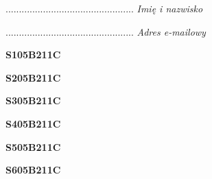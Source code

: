 \begin{turn}{90}\begin{minipage}{\linewidth} \vspace{20mm} ................................................  \textit{Imię i nazwisko}\end{minipage}\end{turn}

\begin{turn}{90}\begin{minipage}{\linewidth} \vspace{20mm} ................................................  \textit{Adres e-mailowy}\end{minipage}\end{turn}

\begin{turn}{90}\huge \begin{minipage}{\linewidth} \vspace{10mm}\textbf{S105B211C}\end{minipage}\end{turn}

\begin{turn}{90}\huge \begin{minipage}{\linewidth} \vspace{10mm}\textbf{S205B211C}\end{minipage}\end{turn}

\begin{turn}{90}\huge \begin{minipage}{\linewidth} \vspace{10mm}\textbf{S305B211C}\end{minipage}\end{turn}

\begin{turn}{90}\huge \begin{minipage}{\linewidth} \vspace{10mm}\textbf{S405B211C}\end{minipage}\end{turn}

\begin{turn}{90}\huge \begin{minipage}{\linewidth} \vspace{10mm}\textbf{S505B211C}\end{minipage}\end{turn}

\begin{turn}{90}\huge \begin{minipage}{\linewidth} \vspace{10mm}\textbf{S605B211C}\end{minipage}\end{turn}

